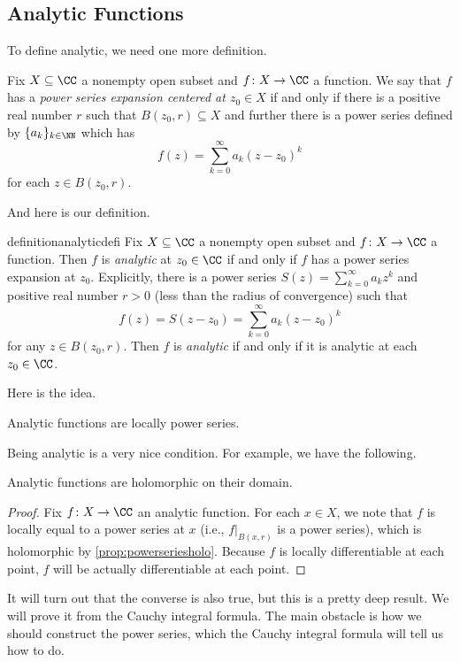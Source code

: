 \subsection{Analytic Functions}
To define analytic, we need one more definition.
\begin{definition}
	Fix $X\subseteq\CC$ a nonempty open subset and $f\colon X\to\CC$ a function. We say that $f$ has a \textit{power series expansion centered at $z_0\in X$}
	if and only if there is a positive real number $r$ such that $B(z_0,r)\subseteq X$ and further there is a power series defined by
	$\{a_k\}_{k\in\NN}$ which has
	\[f(z)=\sum_{k=0}^\infty a_k(z-z_0)^k\]
	for each $z\in B(z_0,r)$.
\end{definition}
And here is our definition.
\begin{restatable}[Analytic]{definition}{analyticdefi}
	Fix $X\subseteq\CC$ a nonempty open subset and $f\colon X\to\CC$ a function. Then $f$ is \textit{analytic} at $z_0\in\CC$ if and only if $f$ has a power series expansion at $z_0$. Explicitly, there is a power series $S(z)=\sum_{k=0}^\infty a_kz^k$ and positive real number $r>0$ (less than the radius of convergence) such that
	\[f(z)=S(z-z_0)=\sum_{k=0}^\infty a_k(z-z_0)^k\]
	for any $z\in B(z_0,r)$. Then $f$ is \textit{analytic} if and only if it is analytic at each $z_0\in\CC$.
\end{restatable}
\noindent Here is the idea.
\begin{idea}
	Analytic functions are locally power series.
\end{idea}
Being analytic is a very nice condition. For example, we have the following.
\begin{proposition} \label{prop:anaisholo}
	Analytic functions are holomorphic on their domain.
\end{proposition}
\begin{proof}
	Fix $f\colon X\to\CC$ an analytic function. For each $x\in X$, we note that $f$ is locally equal to a power series at $x$ (i.e., $f|_{B(x,r)}$ is a power series), which is holomorphic by \autoref{prop:powerseriesholo}. Because $f$ is locally differentiable at each point, $f$ will be actually differentiable at each point.
\end{proof}
\begin{remark}
	It will turn out that the converse is also true, but this is a pretty deep result. We will prove it from the Cauchy integral formula. The main obstacle is how we should construct the power series, which the Cauchy integral formula will tell us how to do.
\end{remark}
